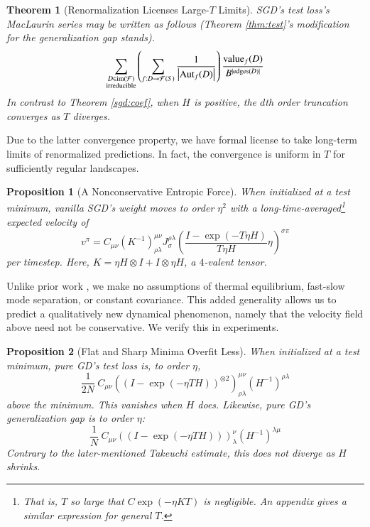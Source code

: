\documentclass{article}
\newtheorem{thm}{Theorem}
\newtheorem{prop}{Proposition}
\newcommand{\Free}{\mathcal{F}}
\newcommand{\Aut}{\text{\textnormal{Aut}}}
\newcommand{\image}{\text{\textnormal{im}}}
\newcommand{\dvalue}{\text{\textnormal{value}}}
\newcommand{\edges}{\text{\textnormal{edges}}}
\newcommand{\wrap}[1]{\left(#1\right)}
\newcommand{\wabs}[1]{\left|#1\right|}
\begin{document}
        \begin{thm}[Renormalization Licenses Large-$T$ Limits] \label{thm:renorm}
            SGD's test loss's MacLaurin series may be written as follows
            (Theorem \ref{thm:test}'s modification for the generalization gap
            stands).
            \begin{equation} \label{eq:renorm}
                \sum_{\substack{D \in \image(\Free)\\ \text{irreducible}}}
                \wrap{
                    \sum_{f: D\to\Free(S)}
                    \frac{1}{\wabs{\Aut_f(D)}}
                }
                \frac{\dvalue_f(D)}{B^{|\edges(D)|}}
            \end{equation}
            In contrast to Theorem \ref{sgd:coef}, when $H$ is positive,
            the $d$th order truncation converges as $T$ diverges.
        \end{thm}
        Due to the latter convergence property, we have formal license to 
        take long-term limits of renormalized predictions.  In fact, the
        convergence is uniform in $T$ for sufficiently regular landscapes.
        \begin{prop}[A Nonconservative Entropic Force]\label{prop:entropic}
            When initialized at a test minimum, vanilla SGD's weight moves to
            order $\eta^2$ with a long-time-averaged\footnote{
                That is, $T$ so large that $C \exp(-\eta K T)$ is negligible.
                An appendix gives a similar expression for general $T$.
            }
            expected velocity of
            $$
                v^\pi = C_{\mu \nu}
                \wrap{K^{-1}}^{\mu\nu}_{\rho\lambda}
                J^{\rho\lambda}_{\sigma}
                \wrap{\frac{I - \exp(-T \eta H)}{T \eta H} \eta}^{\sigma \pi}
            $$
            per timestep.
            Here, $K = \eta H \otimes I + I \otimes \eta H$, a
            $4$-valent tensor. 
        \end{prop}
        Unlike prior work \cite{we19b}, we make no assumptions of
        thermal equilibrium, fast-slow mode separation, or constant covariance.
        This added generality allows us to predict a qualitatively new
        dynamical phenomenon, namely that the velocity field above need not be
        conservative.  We verify this in experiments.
        \begin{prop}[Flat and Sharp Minima Overfit Less]\label{prop:overfit}
            When initialized at a test minimum, pure GD's test loss is, to
            order $\eta$, 
            $$
                \frac{1}{2N} ~
                    C_{\mu\nu}
                    \wrap{(I - \exp(-\eta T H))^{\otimes 2}}^{\mu\nu}_{\rho\lambda}
                    \wrap{H^{-1}}^{\rho\lambda}
            $$
            above the minimum.  This vanishes when $H$ does. 
            Likewise, pure GD's generalization gap is to order $\eta$:  
            $$
                \frac{1}{N} ~
                    C_{\mu\nu}
                    \wrap{(I - \exp(-\eta T H))}^{\nu}_{\lambda}
                    \wrap{H^{-1}}^{\lambda\mu}
            $$
            Contrary to the later-mentioned Takeuchi estimate, this does not
            diverge as $H$ shrinks.
        \end{prop}
\end{document}
